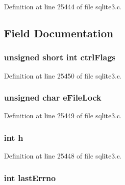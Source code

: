 Definition at line 25444 of file sqlite3.\+c.



\subsection{Field Documentation}
\hypertarget{structunix_file_a703267dc2b2f5100ed329cc2bfab7699}{}
\subsubsection[{ctrl\+Flags}]{\setlength{\rightskip}{0pt plus 5cm}unsigned short int ctrl\+Flags}\label{structunix_file_a703267dc2b2f5100ed329cc2bfab7699}


Definition at line 25450 of file sqlite3.\+c.

\hypertarget{structunix_file_a074528e86f4417f8c3ce538e07908824}{}
\subsubsection[{e\+File\+Lock}]{\setlength{\rightskip}{0pt plus 5cm}unsigned char e\+File\+Lock}\label{structunix_file_a074528e86f4417f8c3ce538e07908824}


Definition at line 25449 of file sqlite3.\+c.

\hypertarget{structunix_file_a16611451551e3d15916bae723c3f59f7}{}
\subsubsection[{h}]{\setlength{\rightskip}{0pt plus 5cm}int h}\label{structunix_file_a16611451551e3d15916bae723c3f59f7}


Definition at line 25448 of file sqlite3.\+c.

\hypertarget{structunix_file_aabab360690091497ac312b35a13e4c56}{}
\subsubsection[{last\+Errno}]{\setlength{\rightskip}{0pt plus 5cm}int last\+Errno}\label{structunix_file_aabab360690091497ac312b35a13e4c56}


